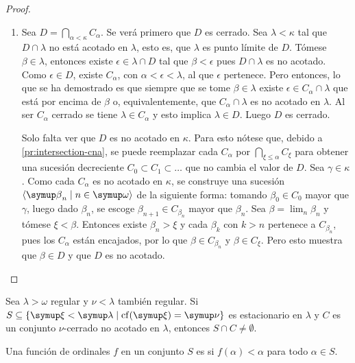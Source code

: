 \documentclass
[
  12pt,
  letterpaper,
  openany,
  oneside,
]{book}
\begin{document}
\begin{proof}
\begin{enumerate}[label=(\roman*)]
        \item Sea $D = \dint_{\alpha<\kappa}C_\alpha$. Se verá primero que $D$ es cerrado.
            Sea $\lambda<\kappa$ tal que $D\cap\lambda$
            no está acotado en $\lambda$, esto es, que $\lambda$ es punto límite de $D$.
            Tómese $\beta\in\lambda$,
            entonces existe $\epsilon\in\lambda\cap D$ tal que $\beta<\epsilon$ pues
            $D\cap\lambda$ es no acotado.
            Como $\epsilon\in D$, existe $C_\alpha$, con $\alpha<\epsilon<\lambda$,
            al que $\epsilon$ pertenece.
            Pero entonces, lo que se ha demostrado es que siempre que se tome $\beta\in\lambda$
            existe $\epsilon\in C_\alpha\cap\lambda$ que está por encima de $\beta$ o, equivalentemente,
            que $C_\alpha\cap\lambda$ es no acotado en $\lambda$.
            Al ser $C_\alpha$ cerrado se tiene $\lambda\in C_\alpha$ y esto implica
            $\lambda\in D$. Luego $D$ es cerrado.

            Solo falta ver que $D$ es no acotado en $\kappa$.
            Para esto nótese que, debido a \ref{pr:intersection-cna},
            se puede reemplazar cada $C_\alpha$ por $\bigcap_{\xi\leq\alpha} C_\xi$
            para obtener una sucesión decreciente $C_0\subset C_1\subset\dots$
            que no cambia el valor de $D$.
            Sea $\gamma\in\kappa$. Como cada $C_\alpha$ es no acotado en $\kappa$,
            se construye una sucesión $\seq{\beta_n\mid n\in\omega}$ de la siguiente forma:
            tomando $\beta_0\in C_0$ mayor que $\gamma$, luego dado $\beta_n$, se escoge
            $\beta_{n+1} \in C_{\beta_n}$ mayor que $\beta_n$. Sea $\beta = \lim_n\beta_n$
            y tómese $\xi<\beta$. Entonces existe $\beta_n>\xi$ y cada $\beta_k$ con $k>n$
            pertenece a $C_{\beta_n}$, pues los $C_\alpha$ están encajados,
            por lo que $\beta\in C_{\beta_n}$ y $\beta\in C_\xi$.
            Pero esto muestra que $\beta\in D$ y que $D$ es no acotado.
    \end{enumerate}
\end{proof}

\begin{teo}\label{teo:stationary-intersect}
    Sea $\lambda>\omega$ regular y $\nu<\lambda$ también regular.
    Si $S\subseteq\set{\xi<\lambda\mid \cf(\xi)=\nu}$ es estacionario en $\lambda$
    y $C$ es un conjunto $\nu$-cerrado no acotado en $\lambda$, entonces $S\cap C\neq\emptyset$.
\end{teo}

\begin{defi}
    Una función de ordinales $f$ en un conjunto $S$ es  si
    $f(\alpha)<\alpha$ para todo $\alpha\in S$.
\end{defi}
\end{document}
